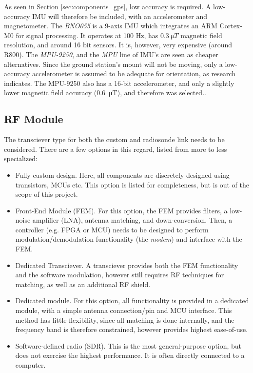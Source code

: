 As seen in Section \ref{sec:components_gps}, low accuracy is required. A low-accuracy IMU will therefore be included, with an accelerometer and magnetometer. The \textit{BNO055} is a 9-axis IMU which integrates an ARM Cortex-M0 for signal processing. It operates at 100 Hz, has $\SI{0.3}{\micro T}$ magnetic field resolution, and around 16 bit sensors. It is, however, very expensive (around R800). The \textit{MPU-9250}, and the \textit{MPU} line of IMU's are seen as cheaper alternatives. Since the ground station's mount will not be moving, only a low-accuracy accelerometer is assumed to be adequate for orientation, as research indicates. The MPU-9250 also has a 16-bit accelerometer, and only a slightly lower magnetic field accuracy (\SI{0.6}{\micro T}), and therefore was selected..

\subsection{RF Module}
The transciever type for both the custom and radiosonde link needs to be considered. There are a few options in this regard, listed from more to less specialized:
\begin{itemize}
    \item Fully custom design. Here, all components are discretely designed using transistors, MCUs etc. This option is listed for completeness, but is out of the scope of this project.
    \item Front-End Module (FEM). For this option, the FEM provides filters, a low-noise amplifier (LNA), antenna matching, and down-conversion. Then, a controller (e.g. FPGA or MCU) needs to be designed to perform modulation/demodulation functionality (the \textit{modem}) and interface with the FEM.
    \item Dedicated Transciever. A transciever provides both the FEM functionality and the software modulation, however still requires RF techniques for matching, as well as an additional RF shield.
    \item Dedicated module. For this option, all functionality is provided in a dedicated module, with a simple antenna connection/pin and MCU interface. This method has little flexibility, since all matching is done internally, and the frequency band is therefore constrained, however provides highest ease-of-use.
    \item Software-defined radio (SDR). This is the most general-purpose option, but does not exercise the highest performance. It is often directly connected to a computer.
\end{itemize}

